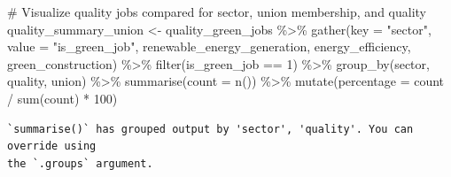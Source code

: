 \documentclass[
  letterpaper,
  DIV=11,
  numbers=noendperiod]{scrartcl}
\newenvironment{Shaded}{\begin{snugshade}}{\end{snugshade}}
\newcommand{\AttributeTok}[1]{\textcolor[rgb]{0.40,0.45,0.13}{#1}}
\newcommand{\CommentTok}[1]{\textcolor[rgb]{0.37,0.37,0.37}{#1}}
\newcommand{\DecValTok}[1]{\textcolor[rgb]{0.68,0.00,0.00}{#1}}
\newcommand{\FunctionTok}[1]{\textcolor[rgb]{0.28,0.35,0.67}{#1}}
\newcommand{\NormalTok}[1]{\textcolor[rgb]{0.00,0.23,0.31}{#1}}
\newcommand{\OtherTok}[1]{\textcolor[rgb]{0.00,0.23,0.31}{#1}}
\newcommand{\SpecialCharTok}[1]{\textcolor[rgb]{0.37,0.37,0.37}{#1}}
\newcommand{\StringTok}[1]{\textcolor[rgb]{0.13,0.47,0.30}{#1}}
\begin{document}
\begin{Shaded}
\begin{Highlighting}[]
\CommentTok{\# Visualize quality jobs compared for sector, union membership, and quality}
\NormalTok{quality\_summary\_union }\OtherTok{\textless{}{-}}\NormalTok{ quality\_green\_jobs }\SpecialCharTok{\%\textgreater{}\%}
  \FunctionTok{gather}\NormalTok{(}\AttributeTok{key =} \StringTok{"sector"}\NormalTok{, }\AttributeTok{value =} \StringTok{"is\_green\_job"}\NormalTok{, renewable\_energy\_generation, energy\_efficiency, green\_construction) }\SpecialCharTok{\%\textgreater{}\%}
  \FunctionTok{filter}\NormalTok{(is\_green\_job }\SpecialCharTok{==} \DecValTok{1}\NormalTok{) }\SpecialCharTok{\%\textgreater{}\%}
  \FunctionTok{group\_by}\NormalTok{(sector, quality, union) }\SpecialCharTok{\%\textgreater{}\%}
  \FunctionTok{summarise}\NormalTok{(}\AttributeTok{count =} \FunctionTok{n}\NormalTok{()) }\SpecialCharTok{\%\textgreater{}\%}
  \FunctionTok{mutate}\NormalTok{(}\AttributeTok{percentage =}\NormalTok{ count }\SpecialCharTok{/} \FunctionTok{sum}\NormalTok{(count) }\SpecialCharTok{*} \DecValTok{100}\NormalTok{)}
\end{Highlighting}
\end{Shaded}

\begin{verbatim}
`summarise()` has grouped output by 'sector', 'quality'. You can override using
the `.groups` argument.
\end{verbatim}
\end{document}
